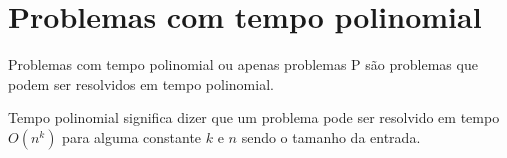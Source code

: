 \section{Problemas com tempo polinomial}
Problemas com tempo polinomial ou apenas problemas P são problemas que podem ser resolvidos em tempo polinomial.

Tempo polinomial significa dizer que um problema pode ser resolvido em tempo $O(n^k)$ para alguma constante $k$ e $n$ sendo o tamanho da entrada.

